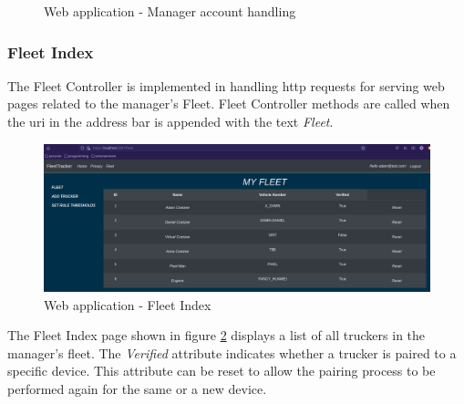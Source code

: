 \begin{figure}[H]
\centering
\caption{Web application - Manager account handling}
\label{fig:webapp_userhandling}
\end{figure}

\pagebreak
\subsubsection{Fleet Index}
The Fleet Controller is implemented in handling \Ac{http} requests for serving web pages related to the manager's Fleet.
Fleet Controller methods are called when the \ac{uri} in the address bar is appended with the text \textit{Fleet}.

\begin{figure}[H]
\centering
\includegraphics[width=6in]{webapp_fleet_index.png}
\caption{Web application - Fleet Index}
\label{fig:webapp_fleet_index}
\end{figure}
The Fleet Index page shown in figure \ref{fig:webapp_fleet_index} displays a list of all truckers in the manager's fleet.
The \textit{Verified} attribute indicates whether a trucker is paired to a specific device.
This attribute can be reset to allow the pairing process to be performed again for the same or a new device.

